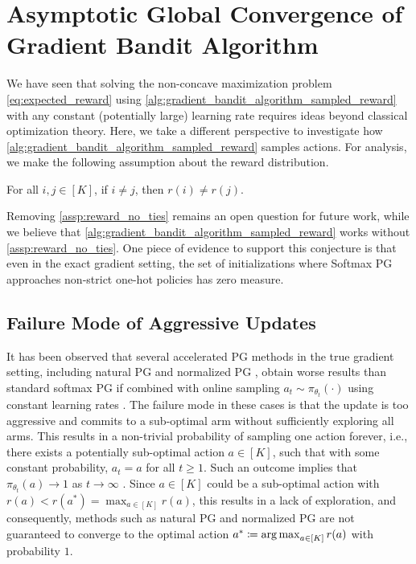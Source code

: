 \section{Asymptotic Global Convergence of Gradient Bandit Algorithm}

We have seen that solving the non-concave maximization problem \cref{eq:expected_reward} using \cref{alg:gradient_bandit_algorithm_sampled_reward} with any constant (potentially large) learning rate requires ideas beyond classical optimization theory. Here, we take a different perspective to investigate how \cref{alg:gradient_bandit_algorithm_sampled_reward} samples actions. For analysis, we make the following assumption about the reward distribution.
\begin{assumption}
\label{assp:reward_no_ties}
For all $i, j \in [K]$, if $i \not= j$, then $r(i) \not= r(j)$.
\end{assumption}
\begin{remark}
Removing \cref{assp:reward_no_ties} remains an open question for future work, while we believe that \cref{alg:gradient_bandit_algorithm_sampled_reward} works without \cref{assp:reward_no_ties}. One piece of evidence to support this conjecture is that even in the exact gradient setting, the set of initializations where Softmax PG approaches non-strict one-hot policies has zero measure.
\end{remark}

\subsection{Failure Mode of Aggressive Updates}
\label{subsec:failure_model_aggressive_updates}

It has been observed that several accelerated PG methods in the true gradient setting, including natural PG \citep{kakade2002natural,agarwal2021theory} and normalized PG \citep{mei2021leveraging}, obtain worse results than standard softmax PG if combined with online sampling $a_t \sim \pi_{\theta_t}(\cdot)$ using constant learning rates \citep{mei2021understanding}. The failure mode in these cases is that the update is too aggressive and commits to a sub-optimal arm without sufficiently exploring all arms. This results in a non-trivial probability of sampling one action forever, i.e., there exists a potentially sub-optimal action $a \in [K]$, such that with some constant probability, $a_t = a$ for all $t \ge 1$. Such an outcome implies that $\pi_{\theta_t}(a) \to 1$ as $t \to \infty$ \citep[Theorem 3]{mei2021understanding}. Since $a \in [K]$ could be a sub-optimal action with $r(a) < r(a^*) = \max_{a \in [K]} r(a)$, this results in a lack of exploration, and consequently, methods such as natural PG and normalized PG are not guaranteed to converge to the optimal action $a^* \coloneqq \operatorname*{arg\,max}_{a \in [K]}{ r(a) }$ with probability $1$.

